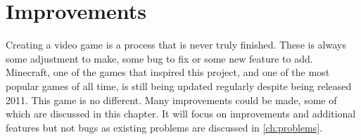 \chapter{Improvements} \label{ch:improvements}
Creating a video game is a process that is never truly finished.
These is always some adjustment to make, some bug to fix or some new feature to add.
Minecraft, one of the games that inspired this project, and one of the most popular games of all time, is still being updated regularly despite being released 2011.
This game is no different.
Many improvements could be made, some of which are discussed in this chapter.
It will focus on improvements and additional features but not bugs as existing problems are discussed in \autoref{ch:problems}.




